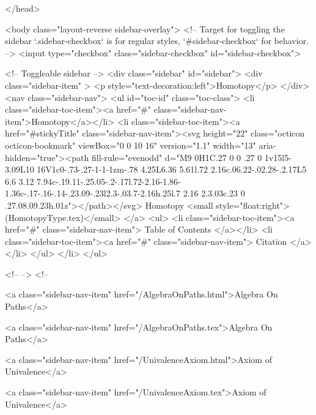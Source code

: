 </head>


  <body class="layout-reverse sidebar-overlay">
    <!-- Target for toggling the sidebar `.sidebar-checkbox` is for regular
     styles, `#sidebar-checkbox` for behavior. -->
<input type="checkbox" class="sidebar-checkbox" id="sidebar-checkbox">

<!-- Toggleable sidebar -->
<div class="sidebar" id="sidebar">
  <div class="sidebar-item" >
    <p style="text-decoration:left">Homotopy</p>
  </div>
  <nav class="sidebar-nav">
    <ul id="toc-id" class="toc-class">
  <li class="sidebar-toc-item"><a href="#" class="sidebar-nav-item">Homotopy</a></li>
  <li class="sidebar-toc-item"><a href="#stickyTitle" class="sidebar-nav-item"><svg height="22" class="octicon octicon-bookmark" viewBox="0 0 10 16" version="1.1" width="13" aria-hidden="true"><path fill-rule="evenodd" d="M9 0H1C.27 0 0 .27 0 1v15l5-3.09L10 16V1c0-.73-.27-1-1-1zm-.78 4.25L6.36 5.61l.72 2.16c.06.22-.02.28-.2.17L5 6.6 3.12 7.94c-.19.11-.25.05-.2-.17l.72-2.16-1.86-1.36c-.17-.16-.14-.23.09-.23l2.3-.03.7-2.16h.25l.7 2.16 2.3.03c.23 0 .27.08.09.23h.01z"></path></svg> Homotopy <small style="float:right">(HomotopyType.tex)</small>
</a>
    <ul>
      <li class="sidebar-toc-item"><a href="#" class="sidebar-nav-item"> Table of Contents </a></li>
      <li class="sidebar-toc-item"><a href="#" class="sidebar-nav-item"> Citation </a></li>
    </ul>
  </li>
</ul>


    <!--  -->
    <!-- 
      
    
      
    
      
    
      
        
      
    
      
        
          <a class="sidebar-nav-item" href="/AlgebraOnPaths.html">Algebra On Paths</a>
        
      
    
      
        
          <a class="sidebar-nav-item" href="/AlgebraOnPaths.tex">Algebra On Paths</a>
        
      
    
      
        
          <a class="sidebar-nav-item" href="/UnivalenceAxiom.html">Axiom of Univalence</a>
        
      
    
      
        
          <a class="sidebar-nav-item" href="/UnivalenceAxiom.tex">Axiom of Univalence</a>
        

